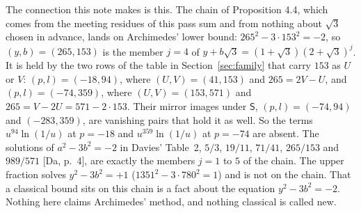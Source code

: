 \documentclass[11pt]{article}
\begin{document}
The connection this note makes is this. The chain of Proposition 4.4, which comes from the meeting residues of this pass sum and from nothing about $\sqrt3$ chosen in advance, lands on Archimedes' lower bound: $265^2-3\cdot153^2=-2$, so $(y,b)=(265,153)$ is the member $j=4$ of $y+b\sqrt3=(1+\sqrt3)(2+\sqrt3)^j$. It is held by the two rows of the table in Section~\ref{sec:family} that carry $153$ as $U$ or $V$: $(p,l)=(-18,94)$, where $(U,V)=(41,153)$ and $265=2V-U$, and $(p,l)=(-74,359)$, where $(U,V)=(153,571)$ and $265=V-2U=571-2\cdot153$. Their mirror images under $\mathsf{S}$, $(p,l)=(-74,94)$ and $(-283,359)$, are vanishing pairs that hold it as well. So the terms $u^{94}\ln(1/u)$ at $p=-18$ and $u^{359}\ln(1/u)$ at $p=-74$ are absent. The solutions of $a^2-3b^2=-2$ in Davies' Table~2, $5/3$, $19/11$, $71/41$, $265/153$ and $989/571$ [Da, p.~4], are exactly the members $j=1$ to $5$ of the chain. The upper fraction solves $y^2-3b^2=+1$ ($1351^2-3\cdot780^2=1$) and is not on the chain. That a classical bound sits on this chain is a fact about the equation $y^2-3b^2=-2$. Nothing here claims Archimedes' method, and nothing classical is called new.
\end{document}
